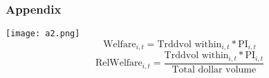 \documentclass{beamer}
\begin{document}
% 


\begin{frame}
\frametitle{Appendix}
\centering \texttt{[image: a2.png]}
$$ \text{Welfare}_{i,t} = \text{Trddvol within}_{i,t} * \text{PI}_{i,t}$$
$$ \text{RelWelfare}_{i,t} = \frac{\text{Trddvol within}_{i,t} * \text{PI}_{i,t}}{\text{Total dollar volume}}  $$
\end{frame}

\end{document}

